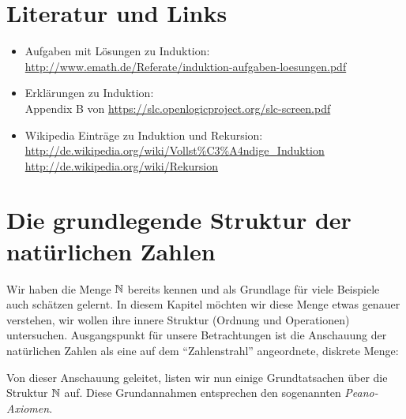 \section*{Literatur und Links}
\begin{itemize}
\item Aufgaben mit Lösungen zu Induktion:\\ \url{http://www.emath.de/Referate/induktion-aufgaben-loesungen.pdf}
\item Erklärungen zu Induktion:\\
Appendix B von \url{https://slc.openlogicproject.org/slc-screen.pdf}
\item Wikipedia Einträge zu Induktion und Rekursion:\\
\url{http://de.wikipedia.org/wiki/Vollst%C3%A4ndige_Induktion}\\
\url{http://de.wikipedia.org/wiki/Rekursion}
\end{itemize}


\section{Die grundlegende Struktur der natürlichen Zahlen}
Wir haben die Menge $\mathbb{N}$ bereits kennen und als Grundlage für viele Beispiele auch schätzen gelernt. In diesem Kapitel möchten wir diese Menge etwas genauer verstehen, wir wollen ihre innere Struktur (Ordnung und Operationen) untersuchen. Ausgangspunkt für unsere Betrachtungen ist die Anschauung der natürlichen Zahlen als eine auf dem ``Zahlenstrahl'' angeordnete, diskrete Menge:

\begin{center}
\end{center}

 Von dieser Anschauung geleitet, listen wir nun einige Grundtatsachen über die Struktur $\mathbb{N}$ auf. Diese Grundannahmen entsprechen den sogenannten \textit{Peano-Axiomen}.

